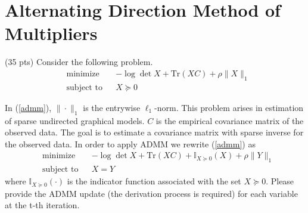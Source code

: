 \section{Alternating Direction Method of Multipliers}
{\color{red} (35 pts)} Consider the following problem.
\begin{equation}
\begin{aligned}
\label{admm}
& \text{minimize }
& & -\log \det X + \text{Tr}(XC) + \rho\|X\|_1 \\
& \text{subject to}
& & X \succeq 0
\end{aligned}
\end{equation}

In (\ref{admm}), \(\| \cdot \|_1\) is the entrywise \(\ell_1\)-norm. This problem arises in estimation of sparse undirected graphical models. \( C \) is the empirical covariance matrix of the observed data. The goal is to estimate a covariance matrix with sparse inverse for the observed data. In order to apply ADMM we rewrite (\ref{admm}) as
\begin{equation}
\begin{aligned}
& \text{minimize }
& & -\log \det X + \text{Tr}(XC) + \mathbb{I}_{X \succeq 0}(X) + \rho\|Y\|_1\\
& \text{subject to}
& &  X = Y
\end{aligned}
\end{equation}
where $\mathbb{I}_{X \succeq 0}(\cdot)$ is the indicator function associated with the set $X \succeq 0$. Please provide the ADMM update (the derivation process is required) for each variable at the t-th iteration.

\solution{}









\newpage